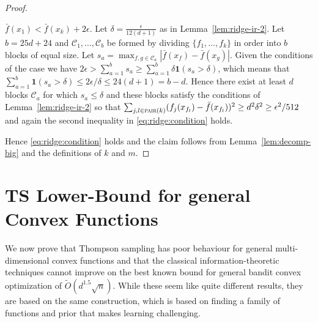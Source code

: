 \documentclass[letter, 12pt]{report}
\newcommand{\pair}{\operatorname{\textsc{pair}}}
\newcommand{\cC}{\mathcal C}
\newcommand{\sind}{\bm{1}}
\newcommand{\1}{\mathbf{1}}
\newcommand{\ts}{\textsc{TS}\xspace}
\theoremstyle{plain}
\theoremstyle{definition}
\theoremstyle{remark}
\begin{document}
\begin{proof}
\begin{enumcases}
        \item $\bar f(x_1) < \bar f(x_k) + 2\epsilon$. Let $\delta = \frac{\epsilon}{12(d+1)}$ as in Lemma~\ref{lem:ridge-ir-2}.
        Let $b = 25d + 24$ and $\cC_1,\ldots,\cC_b$ be formed by dividing $\{f_1,\ldots,f_k\}$ in order into $b$ blocks of equal size.
        Let $s_a = \max_{f,g \in \cC_a} |\bar f(x_f) - \bar f(x_g)|$.
        Given the conditions of the case we have $2\epsilon > \sum_{a=1}^b s_a \geq \sum_{a=1}^b \delta \sind(s_a > \delta)$,
        which means that $\sum_{a=1}^b \sind(s_a > \delta) \leq 2\epsilon / \delta \leq 24(d+1) = b - d$.
        Hence there exist at least $d$ blocks $\cC_a$ for which $s_a \leq \delta$ and these blocks satisfy the conditions of Lemma~\ref{lem:ridge-ir-2} so that
        $\sum_{j,l \in \pair(k)} (f_j(x_{f_l}) - \bar f(x_{f_l}))^2 \geq d^2 \delta^2 \geq \epsilon^2 / 512$ and again the
        second inequality in \cref{eq:ridge:condition} holds.
    \end{enumcases}
    Hence \cref{eq:ridge:condition} holds and the claim follows from Lemma~\ref{lem:decomp-big} and the definitions of $k$ and $m$.
\end{proof}

\chapter{\ts Lower-Bound for general Convex Functions}
\label{chp:ts-lower-proof}
We now prove that
Thompson sampling has poor behaviour for general multi-dimensional convex functions and
that the classical information-theoretic techniques cannot improve on the best known bound for general bandit convex optimization
of $\tilde O(d^{1.5} \sqrt{n})$. While these seem like quite different results, they are based on the same construction, which is
based on finding a family of functions and prior that makes learning challenging.
\end{document}
